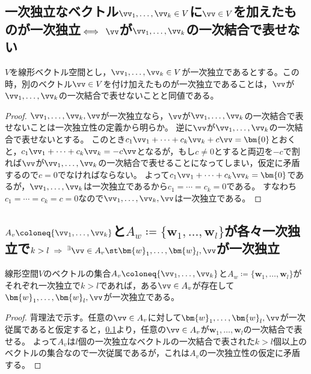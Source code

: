         \subsection{一次独立なベクトル\texorpdfstring{$\vv_1,\dotsc,\vv_k\in V$}{v1,...,vk ∈ V}に\texorpdfstring{$\vv\in V$}{v∈V}を加えたものが一次独立\texorpdfstring{$\iff\;\vv$}{⇔ v}が\texorpdfstring{$\vv_1,\dotsc,\vv_k$}{v1,...,vk}の一次結合で表せない}
            \label{subsec:一次独立なベクトルの，独立集合族としての性質}
            \begin{shadebox}
                $V$を線形ベクトル空間とし，$\vv_1,\dotsc,\vv_k\in V$が一次独立であるとする。この時，別のベクトル$\vv\in V$を付け加えたものが一次独立であることは，$\vv$が$\vv_1,\dotsc,\vv_k$の一次結合で表せないことと同値である。
            \end{shadebox}
            \begin{proof}
                $\vv_1,\dotsc,\vv_k,\vv$が一次独立なら，$\vv$が$\vv_1,\dotsc,\vv_k$の一次結合で表せないことは一次独立性の定義から明らか。
                逆に$\vv$が$\vv_1,\dotsc,\vv_k$の一次結合で表せないとする。
                このとき$c_1\vv_1 + \dotsb + c_k\vv_k + c\vv = \bm{0}$とおくと，$c_1\vv_1 + \dotsb + c_k\vv_k = -c\vv$となるが，もし$c\neq 0$とすると両辺を$-c$で割れば$\vv$が$\vv_1,\dotsc,\vv_k$の一次結合で表せることになってしまい，仮定に矛盾するので$c=0$でなければならない。
                よって$c_1\vv_1 + \dotsb + c_k\vv_k = \bm{0}$であるが，$\vv_1,\dotsc,\vv_k$は一次独立であるから$c_1=\dotsb=c_k=0$である。
                すなわち$c_1=\dotsb=c_k=c=0$なので$\vv_1,\dotsc,\vv_k,\vv$は一次独立である。
            \end{proof}
        \subsection{\texorpdfstring{$A_v\coloneq\{\vv_1,\dotsc,\vv_k\}$}{Av := \{v1,...,vk\}}と\texorpdfstring{$A_w\coloneq\{\bm{w}_1,\dotsc,\bm{w}_l\}$}{Aw := \{w1,...,wl\}}が各々一次独立で\texorpdfstring{$k>l\; \Rightarrow\; ^\exists\vv\in A_v \st \bm{w}_1,\dotsc,\bm{w}_l,\vv$}{k>k ⇒ ∃v∈Av s.t. w1,...,wl,v}が一次独立}
            \begin{shadebox}
                線形空間$V$のベクトルの集合$A_v\coloneq\{\vv_1,\dotsc,\vv_k\}$と$A_w\coloneq\{\bm{w}_1,\dotsc,\bm{w}_l\}$がそれぞれ一次独立で$k>l$であれば，ある$\vv\in A_v$が存在して$\bm{w}_1,\dotsc,\bm{w}_l,\vv$が一次独立である。
            \end{shadebox}
            \begin{proof}
                背理法で示す。任意の$\vv\in A_v$に対して$\bm{w}_1,\dotsc,\bm{w}_l,\vv$が一次従属であると仮定すると，\ref{subsec:一次独立なベクトルの，独立集合族としての性質}より，任意の$\vv\in A_v$が$\bm{w}_1,\dotsc,\bm{w}_l$の一次結合で表せる。
                よって$A_v$は$l$個の一次独立なベクトルの一次結合で表された$k>l$個以上のベクトルの集合なので一次従属であるが，これは$A_v$の一次独立性の仮定に矛盾する。
            \end{proof}
